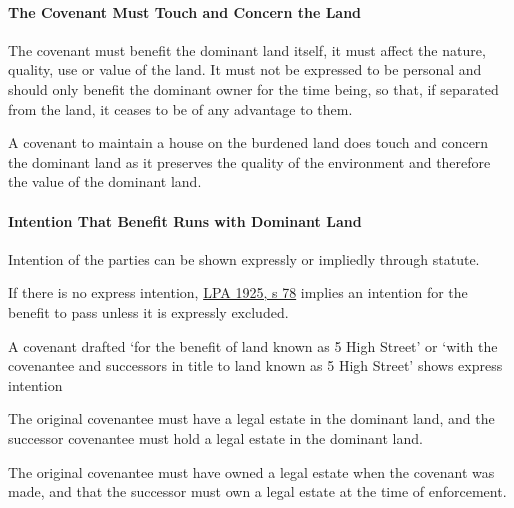\documentclass[
]{article}
\newenvironment{Shaded}{}{}
\newcommand{\NormalTok}[1]{#1}
\begin{document}
\hypertarget{the-covenant-must-touch-and-concern-the-land}{%
\paragraph{The Covenant Must Touch and Concern the
Land}\label{the-covenant-must-touch-and-concern-the-land}}

The covenant must benefit the dominant land itself, it must affect the
nature, quality, use or value of the land. It must not be expressed to
be personal and should only benefit the dominant owner for the time
being, so that, if separated from the land, it ceases to be of any
advantage to them.

\begin{Shaded}
\begin{Highlighting}[]
\NormalTok{A covenant to maintain a house on the burdened land does touch and concern the dominant land as it preserves the quality of the environment and therefore the value of the dominant land.}
\end{Highlighting}
\end{Shaded}

\hypertarget{intention-that-benefit-runs-with-dominant-land}{%
\paragraph{Intention That Benefit Runs with Dominant
Land}\label{intention-that-benefit-runs-with-dominant-land}}

Intention of the parties can be shown expressly or impliedly through
statute.

If there is no express intention,
\href{https://www.legislation.gov.uk/ukpga/Geo5/15-16/20/section/78}{LPA
1925, s 78} implies an intention for the benefit to pass unless it is
expressly excluded.

\begin{Shaded}
\begin{Highlighting}[]
\NormalTok{A covenant drafted ‘for the benefit of land known as 5 High Street’ or ‘with the covenantee and successors in title to land known as 5 High Street’ shows express intention}
\end{Highlighting}
\end{Shaded}

The original covenantee must have a legal estate in the dominant land,
and the successor covenantee must hold a legal estate in the dominant
land.

The original covenantee must have owned a legal estate when the covenant
was made, and that the successor must own a legal estate at the time of
enforcement.
\end{document}
